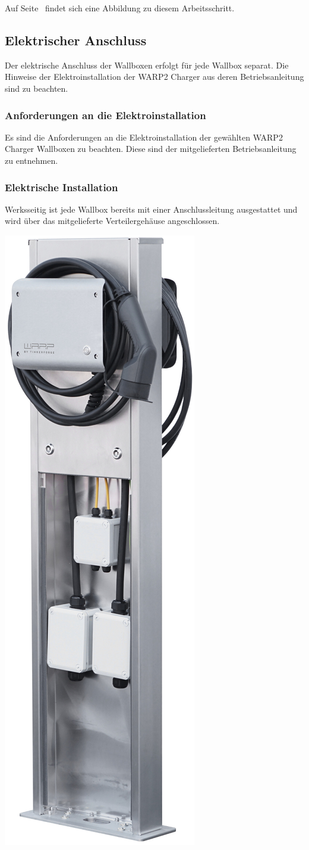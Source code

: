 \documentclass[a4paper,10pt]{article}
\begin{document}
\begin{multicols*}{2}
	Auf Seite~\pageref{appendix_erection} findet sich eine
	Abbildung zu diesem Arbeitsschritt.

	\subsection{Elektrischer Anschluss}
	Der elektrische Anschluss der Wallboxen erfolgt für jede Wallbox separat.
	Die Hinweise der Elektroinstallation der WARP2 Charger aus deren
	Betriebsanleitung sind zu beachten.

	\subsubsection{Anforderungen an die Elektroinstallation}
	Es sind die Anforderungen an die Elektroinstallation der gewählten WARP2
	Charger Wallboxen zu beachten. Diese sind der mitgelieferten
	Betriebsanleitung zu entnehmen.

	\subsubsection{Elektrische Installation}
	Werksseitig ist jede Wallbox bereits mit einer Anschlussleitung
	ausgestattet und wird über das mitgelieferte Verteilergehäuse
	angeschlossen.

	\begin{center}
		\includegraphics[width=0.3\linewidth]{./img/warp-charger-stand-back-opened}
	\end{center}


\end{multicols*}
\end{document}
